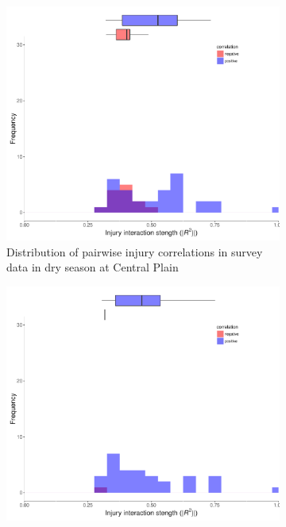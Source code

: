 \begin{figure}
\begin{subfigure}[b]{0.5\textwidth}
        \includegraphics[width = 1\textwidth]{figures/combinedplotTM_ds.pdf}
        \caption{Distribution of pairwise injury correlations in survey data in dry season at Central Plain}
        \label{fig:fig:cortest7}
    \end{subfigure}
\begin{subfigure}[b]{0.5\textwidth}
        \includegraphics[width = 1\textwidth]{figures/combinedplotTM_ws.pdf}

\end{subfigure}
\end{figure}
